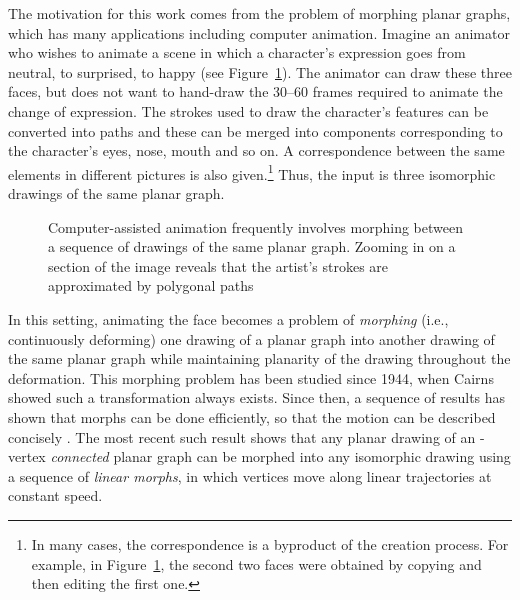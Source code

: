 \documentclass[11pt]{patmorin}
\begin{document}
The motivation for this work comes from the
problem of morphing planar graphs, which has many applications
\cite{erten.kobourov.ea:intersection-free,friedrich.eades:graph,gotsman.surazhsky:guaranteed,surazhsky.gotsman:controllable,surazhsky.gotsman:intrinsic}
including computer animation.  Imagine an animator who wishes to animate a
scene in which a character's expression goes from neutral, to surprised,
to happy (see Figure~\ref{fig:faces}). The animator can draw these
three faces, but does not want to hand-draw the 30--60 frames required
to animate the change of expression.  The strokes used to draw the
character's features can be converted into paths and these can be merged
into components corresponding to the character's eyes, nose, mouth and
so on.  A correspondence between the same elements in different pictures
is also given.\footnote{In many cases, the correspondence is a byproduct
of the creation process. For example, in Figure~\ref{fig:faces}, the
second two faces were obtained by copying and then editing the first one.}
Thus, the input is three isomorphic drawings of the same planar graph.

\begin{figure}
  \caption{Computer-assisted animation frequently involves morphing between
   a sequence of drawings of the same planar graph.  Zooming in on a section
   of the image reveals that the artist's strokes are approximated by polygonal
   paths}
  \label{fig:faces}
\end{figure}

In this setting, animating the face becomes a problem of
\emph{morphing} (i.e., continuously deforming) one drawing of
a planar graph into another drawing of the same planar graph
while maintaining planarity of the drawing throughout the
deformation. This morphing problem has been studied since 1944,
when Cairns \cite{cairns:deformations} showed such a transformation
always exists.  Since then, a sequence of results has shown that morphs
can be done efficiently, so that the motion can be described concisely
\cite{alamdari.angelini.ea:morphing,angelini.dalozzo.ea:morphing,grunbaum.shephard:geometry,thomassen:deformations}.
The most recent such result \cite{angelini.dalozzo.ea:morphing} shows
that any planar drawing of an -vertex \emph{connected} planar graph
can be morphed into any isomorphic drawing using a sequence of 
\emph{linear morphs}, in which vertices move along linear trajectories
at constant speed.
\end{document}
